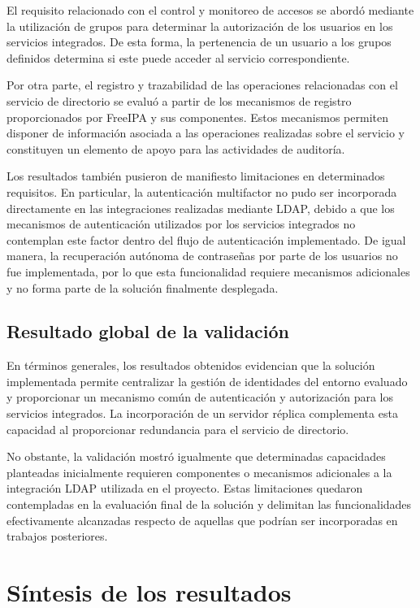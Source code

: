 El requisito relacionado con el control y monitoreo de accesos se abordó mediante la utilización de grupos para determinar la autorización de los usuarios en los servicios integrados. De esta forma, la pertenencia de un usuario a los grupos definidos determina si este puede acceder al servicio correspondiente.

Por otra parte, el registro y trazabilidad de las operaciones relacionadas con el servicio de directorio se evaluó a partir de los mecanismos de registro proporcionados por FreeIPA y sus componentes. Estos mecanismos permiten disponer de información asociada a las operaciones realizadas sobre el servicio y constituyen un elemento de apoyo para las actividades de auditoría.

Los resultados también pusieron de manifiesto limitaciones en determinados requisitos. En particular, la autenticación multifactor no pudo ser incorporada directamente en las integraciones realizadas mediante LDAP, debido a que los mecanismos de autenticación utilizados por los servicios integrados no contemplan este factor dentro del flujo de autenticación implementado. De igual manera, la recuperación autónoma de contraseñas por parte de los usuarios no fue implementada, por lo que esta funcionalidad requiere mecanismos adicionales y no forma parte de la solución finalmente desplegada.

\subsection{Resultado global de la validación}
\label{subsec:resultado-global-validacion}

En términos generales, los resultados obtenidos evidencian que la solución implementada permite centralizar la gestión de identidades del entorno evaluado y proporcionar un mecanismo común de autenticación y autorización para los servicios integrados. La incorporación de un servidor réplica complementa esta capacidad al proporcionar redundancia para el servicio de directorio.

No obstante, la validación mostró igualmente que determinadas capacidades planteadas inicialmente requieren componentes o mecanismos adicionales a la integración LDAP utilizada en el proyecto. Estas limitaciones quedaron contempladas en la evaluación final de la solución y delimitan las funcionalidades efectivamente alcanzadas respecto de aquellas que podrían ser incorporadas en trabajos posteriores.

\section{Síntesis de los resultados}
\label{sec:sintesis-resultados}

